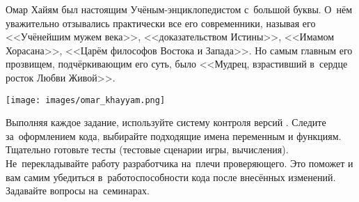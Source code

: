 \documentclass[a4paper,11pt,landscape,notitlepage,oneside,openany,final]{memoir}
\begin{document}



\newcommand{\tabheaderitem}[2]{\multicolumn{1}{#1}{\multirow{2}{*}{#2}}}

\newcommand*{\test}{\makebox[1.2cm]{тест}}
\newcommand*{\ctrl}[1]{\multicolumn{2}{c}{\makebox[1.2cm]{к./р. #1}}}
\newcommand*{\task}[1]{\makebox[0.8cm]{з. #1}}
\newcommand*{\quiz}[1]{\makebox[2.4em]{\small гл.\,#1}}
\newcommand*{\qsum}{\makebox{к./о.\(_\Sigma\)}}

\newcommand*{\groupmark}[1]{\textit{группа \textbf{#1}}}
\newcommand*{\groupsection}[1]{\AbstractSection{Группа №\,\textbf{#1}}}

\newcommand*{\pd}{\text{\(+\)\hspace{-3pt}.}}
\newcommand*{\md}{\text{\(-\)\hspace{-3pt}.}}

\newcommand*{\deadline}[1]{\textit{\bfseries\color{DarkRed!60}#1}}

\newcommand*{\grade}[1]{\textcolor{DarkRed!60}{(#1)}}


\clearpage
\begin{epigraphs}
    \large\itshape%
\end{epigraphs}

\begin{center}
    \begin{minipage}[b]{18em}
     	\large Омар Хайям был настоящим Учёным-энциклопедистом с~большой буквы. О~нём уважительно отзывались практически все его современники, называя его <<Учёнейшим мужем века>>, <<доказательством Истины>>, <<Имамом Хорасана>>, <<Царём философов Востока и Запада>>. Но самым главным его прозвищем, подчёркивающим его суть, было <<Мудрец, взрастивший в~сердце росток Любви Живой>>.

        \vspace{5ex}
    \end{minipage}\hspace{3em}
    \texttt{[image: images/omar\_khayyam.png]}
\end{center}


\clearpage
\renewcommand{\rightmark}{Задания}
Выполняя каждое задание, используйте систему контроля версий \git{}. Следите за~оформлением кода, выбирайте подходящие имена переменным и функциям. Тщательно готовьте тесты (тестовые сценарии игры, вычисления). Не~перекладывайте работу разработчика на~плечи проверяющего. Это поможет и вам самим убедиться в~работоспособности кода после внесённых изменений. Задавайте вопросы на~семинарах.
\end{document}
